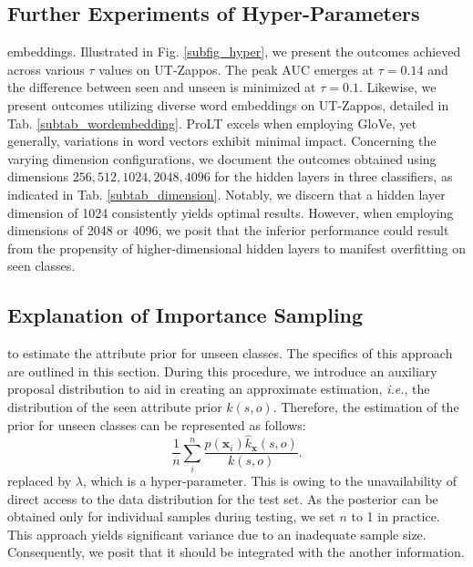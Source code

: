 \documentclass[letterpaper]{article} %
\newcommand{\mx}{\mathbf{x}}
\newcommand{\ie}{\textit{i.e.}}
\theoremstyle{definition}
\begin{document}
\subsection{Further Experiments of Hyper-Parameters}
 embeddings. Illustrated in Fig. \ref{subfig_hyper}, we present the outcomes achieved across various $\tau$ values on UT-Zappos. The peak AUC emerges at $\tau=0.14$ and the difference between seen and unseen is minimized at $\tau=0.1$. Likewise, we present outcomes utilizing diverse word embeddings on UT-Zappos, detailed in Tab. \ref{subtab_wordembedding}. ProLT excels when employing GloVe, yet generally, variations in word vectors exhibit minimal impact. Concerning the varying dimension configurations, we document the outcomes obtained using dimensions ${256,512,1024,2048,4096}$ for the hidden layers in three classifiers, as indicated in Tab. \ref{subtab_dimension}. Notably, we discern that a hidden layer dimension of 1024 consistently yields optimal results. However, when employing dimensions of 2048 or 4096, we posit that the inferior performance could result from the propensity of higher-dimensional hidden layers to manifest overfitting on seen classes.

\subsection{Explanation of Importance Sampling}
 to estimate the attribute prior for unseen classes. The specifics of this approach are outlined in this section. During this procedure, we introduce an auxiliary proposal distribution to aid in creating an approximate estimation, \ie, the distribution of the seen attribute prior $k(s,o)$. Therefore, the estimation of the prior for unseen classes can be represented as follows:
	\begin{equation}
\frac{1}{n}\sum_{i}^{n}\frac{p(\mx_i)\hat{k}_{\mx}(s,o)}{k(s,o)}.
        \label{subeq_is}
	\end{equation}
 replaced by $\lambda$, which is a hyper-parameter. This is owing to the unavailability of direct access to the data distribution for the test set. As the posterior can be obtained only for individual samples during testing, we set $n$ to 1 in practice. This approach yields significant variance due to an inadequate sample size. Consequently, we posit that it should be integrated with the another information.
\end{document}
